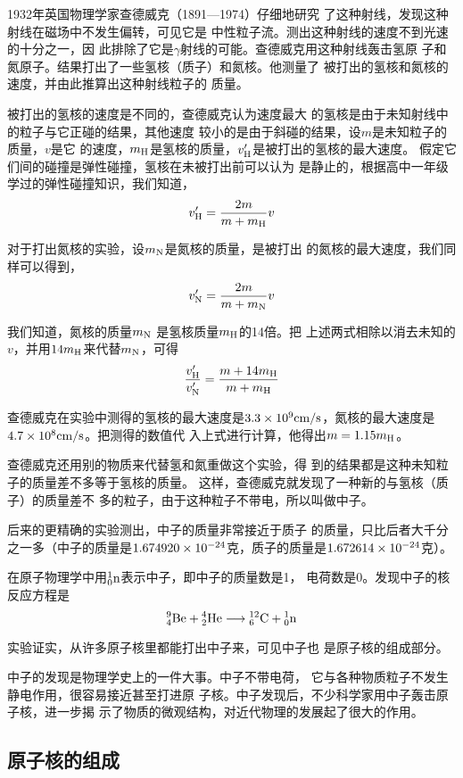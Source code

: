 1932年英国物理学家查德威克（1891—1974）仔细地研究
了这种射线，发现这种射线在磁场中不发生偏转，可见它是
中性粒子流。测出这种射线的速度不到光速的十分之一，因
此排除了它是$\gamma$射线的可能。查德威克用这种射线轰击氢原
子和氮原子。结果打出了一些氢核（质子）和氮核。他测量了
被打出的氢核和氮核的速度，并由此推算出这种射线粒子的
质量。

被打出的氢核的速度是不同的，查德威克认为速度最大
的氢核是由于未知射线中的粒子与它正碰的结果，其他速度
较小的是由于斜碰的结果，设$m$是未知粒子的质量，$v$是它
的速度，$m_{\rm H}$是氢核的质量，$v'_{\rm H}$是被打出的氢核的最大速度。
假定它们间的碰撞是弹性碰撞，氢核在未被打出前可以认为
是静止的，根据高中一年级学过的弹性碰撞知识，我们知道，
\[ v'_{\rm H}=\frac{2m}{m+m_{\rm H}}v \]

对于打出氮核的实验，设$m_{\rm N}$是氮核的质量，是被打出
的氮核的最大速度，我们同样可以得到，
\[ v'_{\rm N}=\frac{2m}{m+m_{\rm N}}v\]

我们知道，氮核的质量$m_{\rm N}$
是氢核质量$m_{\rm H}$的14倍。把
上述两式相除以消去未知的$v$，并用$14m_{\rm H}$来代替$m_{\rm N}$，可得
\[ \frac{v'_{\rm H}}{v'_{\rm N}} =\frac{m+14m_{\rm H}}{m+m_{\rm H}}\]

查德威克在实验中测得的氢核的最大速度是$3.3\x10^9{\rm cm}/{\rm s}$，氮核的最大速度是$4.7\x10^8{\rm cm}/{\rm s}$。把测得的数值代
入上式进行计算，他得出$m=1.15m_{\rm H}$。

查德威克还用别的物质来代替氢和氮重做这个实验，得
到的结果都是这种未知粒子的质量差不多等于氢核的质量。
这样，查德威克就发现了一种新的与氢核（质子）的质量差不
多的粒子，由于这种粒子不带电，所以叫做中子。

后来的更精确的实验测出，中子的质量非常接近于质子
的质量，只比后者大千分之一多（中子的质量是$1.674920\x
10^{-24}$克，质子的质量是$1.672614\x10^{-24}$克）。

在原子物理学中用$\atom{n}{1}{0}$表示中子，即中子的质量数是1，
电荷数是0。发现中子的核反应方程是
\[\atom{Be}{9}{4}+\atom{He}{4}{2}\longrightarrow \atom{C}{12}{6}+\atom{n}{1}{0}  \]

实验证实，从许多原子核里都能打出中子来，可见中子也
是原子核的组成部分。

中子的发现是物理学史上的一件大事。中子不带电荷，
它与各种物质粒子不发生静电作用，很容易接近甚至打进原
子核。中子发现后，不少科学家用中子轰击原子核，进一步揭
示了物质的微观结构，对近代物理的发展起了很大的作用。

\subsection{原子核的组成}

